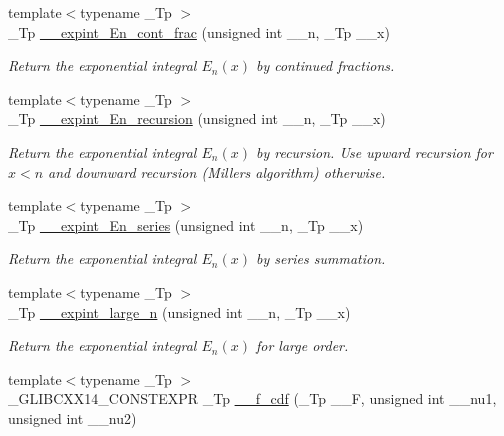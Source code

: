 \begin{DoxyCompactItemize}
{\footnotesize template$<$typename \+\_\+\+Tp $>$ }\\\+\_\+\+Tp \hyperlink{namespacestd_1_1____detail_a34e1eb1248cdad9ceed2aa33732de6ea}{\+\_\+\+\_\+expint\+\_\+\+En\+\_\+cont\+\_\+frac} (unsigned int \+\_\+\+\_\+n, \+\_\+\+Tp \+\_\+\+\_\+x)
\begin{DoxyCompactList}\small\item\em Return the exponential integral $ E_n(x) $ by continued fractions. \end{DoxyCompactList}\item 
{\footnotesize template$<$typename \+\_\+\+Tp $>$ }\\\+\_\+\+Tp \hyperlink{namespacestd_1_1____detail_a9b0a2050324390fb6c4a584170289a99}{\+\_\+\+\_\+expint\+\_\+\+En\+\_\+recursion} (unsigned int \+\_\+\+\_\+n, \+\_\+\+Tp \+\_\+\+\_\+x)
\begin{DoxyCompactList}\small\item\em Return the exponential integral $ E_n(x) $ by recursion. Use upward recursion for $ x < n $ and downward recursion (Miller\textquotesingle{}s algorithm) otherwise. \end{DoxyCompactList}\item 
{\footnotesize template$<$typename \+\_\+\+Tp $>$ }\\\+\_\+\+Tp \hyperlink{namespacestd_1_1____detail_a5c51269e411cd82ffec2e63212f76b41}{\+\_\+\+\_\+expint\+\_\+\+En\+\_\+series} (unsigned int \+\_\+\+\_\+n, \+\_\+\+Tp \+\_\+\+\_\+x)
\begin{DoxyCompactList}\small\item\em Return the exponential integral $ E_n(x) $ by series summation. \end{DoxyCompactList}\item 
{\footnotesize template$<$typename \+\_\+\+Tp $>$ }\\\+\_\+\+Tp \hyperlink{namespacestd_1_1____detail_a75b6c98f991ef9265e69c27feb554276}{\+\_\+\+\_\+expint\+\_\+large\+\_\+n} (unsigned int \+\_\+\+\_\+n, \+\_\+\+Tp \+\_\+\+\_\+x)
\begin{DoxyCompactList}\small\item\em Return the exponential integral $ E_n(x) $ for large order. \end{DoxyCompactList}\item 
{\footnotesize template$<$typename \+\_\+\+Tp $>$ }\\\+\_\+\+G\+L\+I\+B\+C\+X\+X14\+\_\+\+C\+O\+N\+S\+T\+E\+X\+P\+R \+\_\+\+Tp \hyperlink{namespacestd_1_1____detail_a6864e83328d0ac8f2c26e8ac4a0a3e35}{\+\_\+\+\_\+f\+\_\+cdf} (\+\_\+\+Tp \+\_\+\+\_\+\+F, unsigned int \+\_\+\+\_\+nu1, unsigned int \+\_\+\+\_\+nu2)

\end{DoxyCompactItemize}
